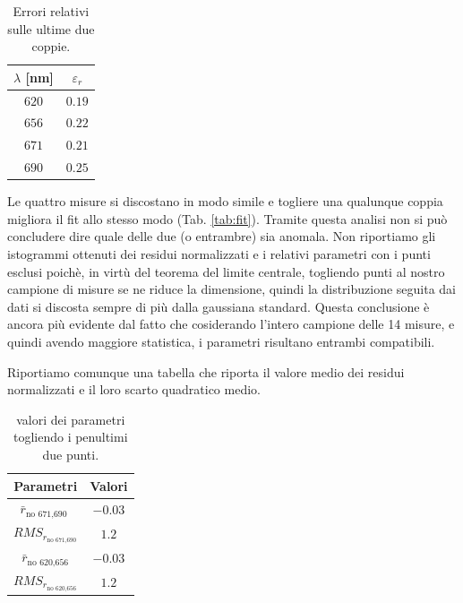 \documentclass[10pt,twocolumn]{article}
\begin{document}
      \begin{table}[H]
    \centering
    \begin{tabular}{cc}
        \toprule
        \textbf{$\lambda$} [nm] & \textbf{$\varepsilon_{r}$} \\
        \midrule
       
        $620$ & $0.19$ \\
        $656$ & $0.22$ \\
        $671$ & $0.21$ \\
        $690$ & $0.25$ \\
       
        \bottomrule
    \end{tabular}
    \caption{Errori relativi sulle ultime due coppie.}
    \label{tab:risultati_fit_nuovi}
\end{table}

   \noindent Le quattro misure si discostano in modo simile e togliere una qualunque coppia migliora il fit allo stesso modo (Tab. \ref{tab:fit}). Tramite questa analisi non si può concludere dire quale delle due (o entrambre) sia anomala.
  \noindent Non riportiamo gli istogrammi ottenuti dei residui normalizzati e i relativi parametri con i punti esclusi poichè, in virtù del teorema del limite centrale, togliendo punti al nostro campione di misure se ne riduce la dimensione,
   quindi la distribuzione seguita dai dati si discosta sempre di più dalla gaussiana standard. 
Questa conclusione è ancora più evidente dal fatto che cosiderando l'intero campione delle 14 misure, e quindi avendo maggiore statistica, i parametri risultano entrambi compatibili.
    
Riportiamo comunque una tabella che riporta il valore medio dei residui normalizzati e il loro scarto quadratico medio.
      \begin{table}[H]
    \centering
    \begin{tabular}{cc}
        \toprule
        \textbf{Parametri} & \textbf{Valori} \\
        \midrule
    
        $\bar{r}_{\text{no 671,690 }}$ & $-0.03$  \\
        $RMS_{r_{\text{no 671,690}}}$ & $1.2$  \\
        $\bar{r}_{\text{no 620,656}} $ &  $-0.03$ \\
        $RMS_{r_{\text{no 620,656}}}$ & $1.2$ \\
        \bottomrule
    \end{tabular}
    \caption{valori dei parametri togliendo i penultimi due punti.}
    \label{tab:risultati_fit_nuovi}
\end{table}
\end{document}
